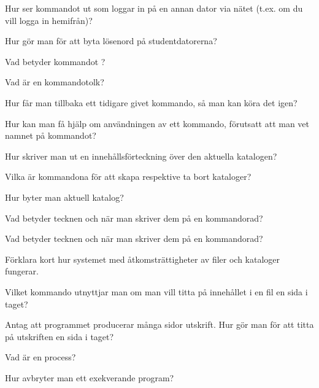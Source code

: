 \begin{Kontrollfragor}
	\item Hur ser kommandot ut som loggar in på en annan dator via nätet (t.ex. om du vill logga in hemifrån)?
	\item Hur gör man för att byta lösenord på studentdatorerna?
	\item Vad betyder kommandot ?
	\item Vad är en kommandotolk?
	\item Hur får man tillbaka ett tidigare givet kommando, så man kan köra det igen?
	\item Hur kan man få hjälp om användningen av ett kommando, förutsatt att man vet namnet på kommandot?
	\item Hur skriver man ut en innehållsförteckning över den aktuella katalogen?
	\item Vilka är kommandona för att skapa respektive ta bort kataloger?
	\item Hur byter man aktuell katalog?
	\item Vad betyder tecknen  och \code{*} när man skriver dem på en kommandorad?
	\item Vad betyder tecknen \code{<} och \code{>} när man skriver dem på en kommandorad?
	\item Förklara kort hur systemet med åtkomsträttigheter av filer och kataloger fungerar.
	\item Vilket kommando utnyttjar man om man vill titta på innehållet i en fil en sida i taget?
	\item Antag att programmet  producerar många sidor utskrift. Hur gör man för att titta på utskriften en sida i taget?
	\item Vad är en process?
	\item Hur avbryter man ett exekverande program?
\end{Kontrollfragor}

\clearpage

